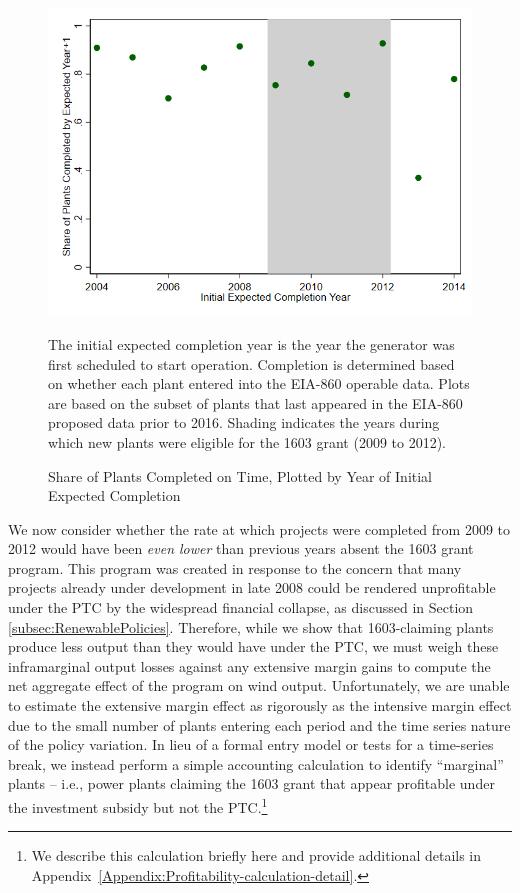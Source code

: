 \documentclass[12pt]{article}
\begin{document}
\begin{figure}[h]
\caption{Share of Plants Completed on Time, Plotted by Year of Initial Expected Completion\label{fig:proposed_completed_on_time}}
\vspace{-15pt}
\begin{center}
\includegraphics[width=0.75\linewidth]{proposal_data_completed_on_time.png}
\end{center}
\vspace{-15pt}
\footnotesize
The initial expected completion year is the year the generator was first scheduled to start operation. Completion is determined based on whether each plant entered into the EIA-860 operable data. Plots are based on the subset of plants that last appeared in the EIA-860 proposed data prior to 2016. Shading indicates the years during which new plants were eligible for the 1603 grant (2009 to 2012).
\end{figure}

We now consider whether the rate at which projects were completed from 2009 to 2012 would have been \emph{even lower} than previous years absent the 1603 grant program. This program was created in response to the concern that many projects already under development in late 2008 could be rendered unprofitable under the PTC by the widespread financial collapse, as discussed in Section \ref{subsec:RenewablePolicies}. Therefore, while we show that 1603-claiming plants produce less output than they would have under the PTC, we must weigh these inframarginal output losses against any extensive margin gains to compute the net aggregate effect of the program on wind output. Unfortunately, we are unable to estimate the extensive margin effect as rigorously as the intensive margin effect due to the small number of plants entering each period and the time series nature of the policy variation. In lieu of a formal entry model or tests for a time-series break, we instead perform a simple accounting calculation to identify ``marginal'' plants  -- i.e., power plants claiming the 1603 grant that appear profitable under the investment subsidy but not the PTC.\footnote{We describe this calculation briefly here and provide additional details in Appendix~\ref{Appendix:Profitability-calculation-detail}.}
\end{document}
